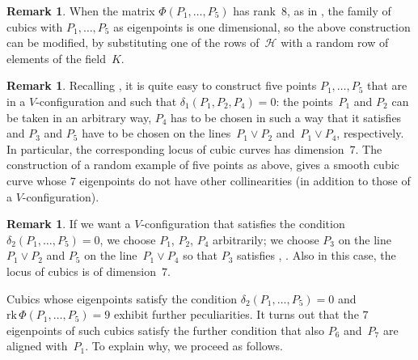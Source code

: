 \documentclass{amsart}
\theoremstyle{plain}
\theoremstyle{definition}
\newtheorem{rmk}[lemma]{Remark}
\newcommand{\rk}{\ensuremath{\mathrm{rk}}}
\begin{document}
\begin{rmk}
When the matrix $\Phi(P_1, \dots, P_5)$ has rank~$8$, as in , the family of
cubics with $P_1, \dots, P_5$ as eigenpoints is one dimensional, so the
above construction can be modified, by substituting one of the rows of~$\mathcal{H}$ with a random row of elements of the field~$K$.
\end{rmk}

\begin{rmk}
\label{rmk:construction_five_d1}
Recalling , it is quite easy to construct five points $P_1, \dots, P_5$ that are in a $V$-configuration
and such that $\delta_1(P_1, P_2, P_4)= 0$: the points~$P_1$
and $P_2$ can be taken in an arbitrary way, $P_4$ has to be chosen in such
a way that it satisfies 
and $P_3$ and $P_5$ have to be chosen on the lines~$P_1 \vee P_2$ and~$P_1 \vee P_4$,
respectively. In particular, the corresponding locus of cubic curves
has dimension~$7$.
The construction of a random example
of five points as above, gives a smooth cubic curve whose $7$ eigenpoints
do not have other collinearities (in addition to those of a
$V$-configuration).
\end{rmk}

\begin{rmk}
\label{rmk:construction_five_d2}
If we want a $V$-configuration that satisfies the condition
$\delta_2(P_1, \dots, P_5) = 0$, we choose $P_1$, $P_2$, $P_4$ arbitrarily;
we choose $P_3$ on the line~$P_1 \vee P_2$ and $P_5$ on the line~$P_1 \vee P_4$ so that $P_3$ satisfies , .
Also in this case, the locus of cubics is of dimension~$7$.
\end{rmk}

Cubics whose eigenpoints satisfy the condition $\delta_2(P_1, \dotsc, P_5) = 0$ and $\rk \, \Phi(P_1, \dotsc, P_5) = 9$ exhibit further peculiarities. It turns out that the $7$ eigenpoints of such cubics satisfy the further
condition that also $P_6$ and~$P_7$ are aligned with~$P_1$. To explain
why, we proceed as follows.
\end{document}
